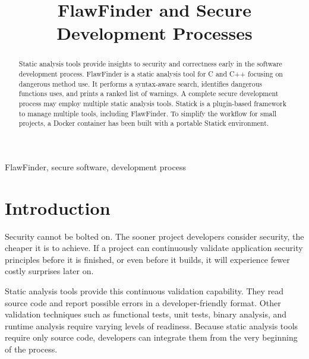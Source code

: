 \documentclass[journal]{IEEEtran}
\begin{document}

\title{FlawFinder and Secure Development Processes}

\author{
}

\maketitle



\begin{abstract}
Static analysis tools provide insights to security and correctness early in the software development
process. FlawFinder is a static analysis tool for C and C++ focusing on dangerous method use. It
performs a syntax-aware search, identifies dangerous functions uses, and prints a ranked list of
warnings. A complete secure development process may employ multiple static analysis tools. Statick
is a plugin-based framework to manage multiple tools, including FlawFinder. To simplify the workflow
for small projects, a Docker container has been built with a portable Statick environment.
\end{abstract}

\begin{IEEEkeywords}
FlawFinder, secure software, development process
\end{IEEEkeywords}



\section{Introduction}

Security cannot be bolted on. The sooner project developers consider security, the cheaper it is to
achieve. If a project can continuously validate application security principles before it is
finished, or even before it builds, it will experience fewer costly surprises later on.

Static analysis tools provide this continuous validation capability. They read source code and
report possible errors in a developer-friendly format. Other validation techniques such as
functional tests, unit tests, binary analysis, and runtime analysis require varying levels of
readiness. Because static analysis tools require only source code, developers can integrate them
from the very beginning of the process.
\end{document}
